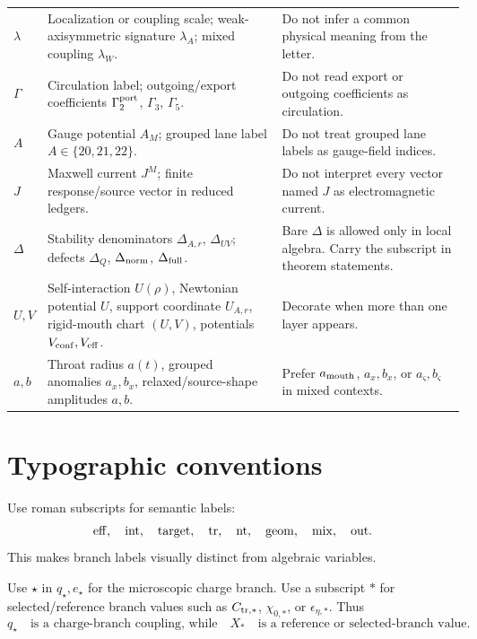 \begin{longtable}{L{0.13\textwidth}L{0.37\textwidth}L{0.41\textwidth}}
\addlinespace
\(\lambda\) & Localization or coupling scale; weak-axisymmetric signature \(\lambda_A\); mixed coupling \(\lambda_W\). & Do not infer a common physical meaning from the letter. \\
\addlinespace
\(\Gamma\) & Circulation label; outgoing/export coefficients \(\Gamma_2^{\rm port}\), \(\Gamma_3\), \(\Gamma_5\). & Do not read export or outgoing coefficients as circulation. \\
\addlinespace
\(A\) & Gauge potential \(A_M\); grouped lane label \(A\in\{20,21,22\}\). & Do not treat grouped lane labels as gauge-field indices. \\
\addlinespace
\(J\) & Maxwell current \(J^M\); finite response/source vector in reduced ledgers. & Do not interpret every vector named \(J\) as electromagnetic current. \\
\addlinespace
\(\Delta\) & Stability denominators \(\Delta_{A,r}\), \(\Delta_{UV}\); defects \(\Delta_Q\), \(\Delta_{\rm norm}\), \(\Delta_{\rm full}\). & Bare \(\Delta\) is allowed only in local algebra.  Carry the subscript in theorem statements. \\
\addlinespace
\(U,V\) & Self-interaction \(U(\rho)\), Newtonian potential \(U\), support coordinate \(U_{A,r}\), rigid-mouth chart \((U,V)\), potentials \(V_{\rm conf},V_{\rm eff}\). & Decorate when more than one layer appears. \\
\addlinespace
\(a,b\) & Throat radius \(a(t)\), grouped anomalies \(a_x,b_x\), relaxed/source-shape amplitudes \(a,b\). & Prefer \(a_{\rm mouth}\), \(a_x,b_x\), or \(a_\varsigma,b_\varsigma\) in mixed contexts. \\
\bottomrule
\end{longtable}

\section{Typographic conventions}
\label{sec:typographic-notation}

Use roman subscripts for semantic labels:
\[
  {\rm eff},
  \quad
  {\rm int},
  \quad
  {\rm target},
  \quad
  {\rm tr},
  \quad
  {\rm nt},
  \quad
  {\rm geom},
  \quad
  {\rm mix},
  \quad
  {\rm out}.
\]
This makes branch labels visually distinct from algebraic variables.

Use \(\star\) in \(q_\star,e_\star\) for the microscopic charge branch.  Use a subscript \(*\) for selected/reference branch values such as \(C_{{\rm tr},*}\), \(\chi_{0,*}\), or \(\epsilon_{\eta,*}\).  Thus
\[
  q_\star
  \quad \text{is a charge-branch coupling, while} \quad
  X_*
  \quad \text{is a reference or selected-branch value.}
\]

